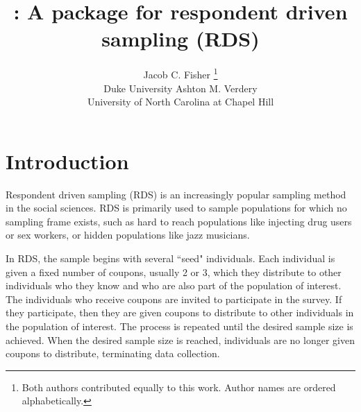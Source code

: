 \documentclass[article]{jss}
\author{Jacob C. Fisher
        \thanks{Both authors contributed equally to this work.  Author names are ordered alphabetically.}
	       \\Duke University \And 
        Ashton M. Verdery\\University of North Carolina at Chapel Hill
								}
\title{\pkg{RDS2}: A \proglang{Stata} package for respondent driven sampling (RDS)}
\begin{document}

\section[Introduction]{Introduction}
Respondent driven sampling (RDS) is an increasingly popular sampling method in the social sciences.  RDS is primarily used to sample populations for which no sampling frame exists, such as hard to reach populations like injecting drug users or sex workers, or hidden populations like jazz musicians.

In RDS, the sample begins with several ``seed" individuals.  Each individual is given a fixed number of coupons, usually 2 or 3, which they distribute to other individuals who they know and who are also part of the population of interest.  The individuals who receive coupons are invited to participate in the survey.  If they participate, then they are given coupons to distribute to other individuals in the population of interest.  The process is repeated until the desired sample size is achieved.  When the desired sample size is reached, individuals are no longer given coupons to distribute, terminating data collection.   



\end{document}

